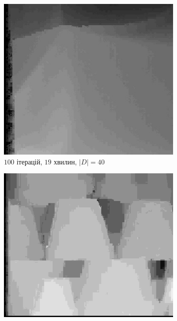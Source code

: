 \begin{figure}[h]
\centering
    \begin{subfigure}[t]{0.32\textwidth}
        \centering
        \includegraphics[width=\textwidth]{images/cloth_superpixel_based_stereo}
        \caption{$100$ ітерацій, $19$ хвилин, $\left| D \right| = 40$}
        \label{fig:cloth:superpixel}
    \end{subfigure}
    \hfill
    \begin{subfigure}[t]{0.32\textwidth}
        \centering
        \includegraphics[width=\textwidth]{images/pots_superpixel_based_stereo}

\end{subfigure}
\end{figure}
